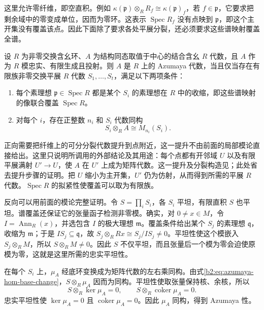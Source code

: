 \ProseParagraphBreak
这里允许零纤维，即空直积。例如 \(\kappa(\mathfrak p)\otimes_RR_f\cong\kappa(\mathfrak p)_f\)，若 \(f\in\mathfrak p\)，它要求把剩余域中的零变成单位，因而为零环。这表示 \(\operatorname{Spec}R_f\) 没有点映到 \(\mathfrak p\)，即这个主开集没有覆盖该点。因此下面除了要求各处平展分裂，还必须要求这些谱映射覆盖全谱。

\begin{theorem}[平展局部分裂]\label{b2:thm:azumaya-etale-splitting}
	设 \(R\) 为非零交换含幺环、\(A\) 为结构同态取值于中心的结合含幺 \(R\) 代数，且 \(A\) 作为 \(R\) 模忠实、有限生成且投射。则 \(A\) 是 \(R\) 上的 Azumaya 代数，当且仅当存在有限族非零交换平展 \(R\) 代数 \(S_1,\ldots,S_t\)，满足以下两项条件：
	\begin{enumerate}
		\item 每个素理想 \(\mathfrak p\in\operatorname{Spec}R\) 都是某个 \(S_i\) 的素理想在 \(R\) 中的收缩，即这些谱映射的像联合覆盖 \(\operatorname{Spec}R\)。
		\item 对每个 \(i\)，存在正整数 \(n_i\) 和 \(S_i\) 代数同构
			\[
				S_i\otimes_RA\cong M_{n_i}(S_i).
			\]
	\end{enumerate}
\end{theorem}
\begin{proofsketch}
	正向需要把纤维上的可分分裂代数提升到点附近，这一提升不由前面的局部模论直接给出。这里只说明所调用的外部结论及其用途：每个点都有开邻域 \(U\) 以及有限平展满射 \(U'\to U\)，使 \(A\) 在 \(U'\) 上成为矩阵代数。这一提升及分裂构造见\cite[Théorème 5.1, Proposition 5.4, Théorème 5.7]{Grothendieck1966BrauerI}；此处省去提升步骤的证明。把 \(U\) 缩小为主开集，\(U'\) 仍为仿射，从而得到所需的平展 \(R\) 代数。\(\operatorname{Spec}R\) 的拟紧性使覆盖可以取为有限族。

	反向可以用前面的模论完整证明。令 \(S=\prod_i S_i\)，各 \(S_i\) 平坦，有限直积 \(S\) 也平坦。谱覆盖还保证它的张量函子检测非零模。确实，对 \(0\ne x\in M\)，令 \(I=\operatorname{Ann}_R(x)\)，并选包含 \(I\) 的极大理想 \(\mathfrak m\)。覆盖条件给出某个 \(S_j\) 的素理想 \(\mathfrak q\)，收缩为 \(\mathfrak m\)；于是 \(IS_j\subseteq\mathfrak q\)，故 \(S_j\otimes_RRx\cong S_j/IS_j\ne0\)。平坦性使这个模嵌入 \(S_j\otimes_RM\)，所以 \(S\otimes_RM\ne0\)。因此 \(S\) 不仅平坦，而且张量后一个模为零会迫使原模为零，这就是这里所需的忠实平坦性。

	在每个 \(S_i\) 上，\(\mu_A\) 经底环变换成为矩阵代数的左右乘同构。由式\eqref{b2:eq:azumaya-hom-base-change}，\(S\otimes_R\mu_A\) 因而为同构。平坦性使取张量保持核、余核，所以
	\[
		S\otimes_R\ker\mu_A=0, \qquad S\otimes_R\operatorname{coker}\mu_A=0.
	\]
	忠实平坦性使 \(\ker\mu_A=0\) 且 \(\operatorname{coker}\mu_A=0\)。因此 \(\mu_A\) 同构，得到 Azumaya 性。
\end{proofsketch}

